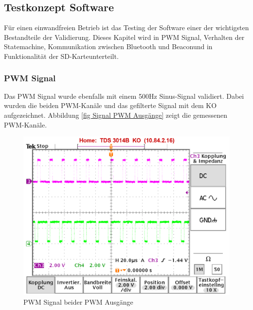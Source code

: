 \subsection{Testkonzept Software}\label{sec:testkonzeptSoftware}

Für einen einwandfreien Betrieb ist das Testing der Software einer der wichtigsten Bestandteile der Validierung. Dieses Kapitel wird in \glqq PWM Signal\grqq, \glqq Verhalten der Statemachine\grqq, \glqq Kommunikation zwischen Bluetooth und Beacon\grqq und in \glqq Funktionalität der SD-Karte\grqq unterteilt.

\subsubsection{PWM Signal}\label{sec: Validierung PWM Signal}

Das PWM Signal wurde ebenfalls mit einem 500Hz Sinus-Signal validiert. Dabei wurden die beiden PWM-Kanäle und das gefilterte Signal mit dem KO aufgezeichnet. Abbildung \ref{fig Signal PWM Ausgänge} zeigt die gemessenen PWM-Kanäle.

\begin{figure}[H]
	\begin{center}
		\includegraphics[width=120mm]{data/PWM_Signal_500Hz_Mono_mit_Infos.png}
		\caption[PWM Signal beider PWM Ausgänge]{PWM Signal beider PWM Ausgänge} %
		\label{fig:Signal PWM Ausgänge}
	\end{center}
\end{figure}


